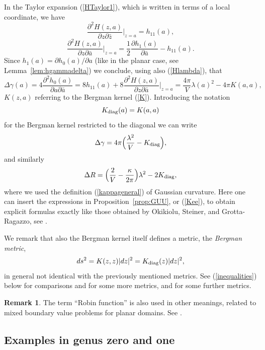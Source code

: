 \documentclass[reqno,12pt]{article}
\theoremstyle{plain}
\theoremstyle{definition}
\newtheorem{remark}[defn]{Remark}
\numberwithin{equation}{section}
\numberwithin{figure}{section}
\begin{document}
In the Taylor expansion (\ref{HTaylor1}), which is written in terms of a local coordinate, we have
$$
\frac{\partial^2 H(z,a)}{\partial z\partial\bar{z}}\Big|_{z=a}=h_{11}(a),
$$
$$
\frac{\partial^2 H(z,a)}{\partial z\partial\bar{a}}\Big|_{z=a}=\frac{1}{2}\frac{\partial h_1(a)}{\partial \bar{a}}-h_{11}(a).
$$
Since $h_1(a)=\partial h_0(a)/\partial a$ (like in the planar case, see Lemma~\ref{lem:hgammadelta})
we conclude, using also (\ref{Hlambda}), that 
$$
\Delta \gamma(a)=4\frac{\partial^2h_0(a)}{\partial a\partial\bar{a}}=8h_{11}(a)
+8\frac{\partial^2 H(z,a)}{\partial z\partial\bar{a}}\Big|_{z=a}
=\frac{4\pi}{V}\lambda(a)^2-4\pi K(a,a),
$$
$K(z,a)$ referring to the Bergman kernel (\ref{K}). Introducing the notation
$$
K_{\rm diag}(a)=K(a,a)
$$
for the Bergman kernel restricted to the diagonal we can write
\begin{equation}\label{Deltagammadouble}
\Delta \gamma=4\pi\Big(\frac{\lambda^2}{V}- K_{\rm diag}\Big),
\end{equation}
and similarly
\begin{equation}\label{DeltaR}
\Delta R =\Big(\frac{2}{V}-\frac{\kappa}{2\pi}\Big) \lambda^2-2K_{\rm diag},
\end{equation}
where we used the definition (\ref{kappageneral})  of Gaussian curvature. Here one can insert
the expressions in Proposition~\ref{prop:GUU}, or (\ref{Kee}), to obtain explicit formulas
exactly like those obtained by Okikiolu, Steiner, and Grotta-Ragazzo, see
 \cite{Okikiolu-2009, Steiner-2005, Grotta-Ragazzo-2024}. 

We remark that also the Bergman kernel itself defines a metric, the {\it Bergman metric},
\begin{equation}\label{Bergman metric}
ds^2=K(z,z)|dz|^2=K_{\rm diag}(z)|dz|^2,
\end{equation}
in general not identical with the previously mentioned metrics.
See (\ref{inequalities}) below for comparisons and for some more metrics,
and \cite{Jost-2001, Krantz-2004, Grotta-Ragazzo-2024} for some further metrics. 

\begin{remark}\label{rem:robin}
The term ``Robin function'' is also used in  other meanings, related to mixed boundary value problems for planar
domains. See \cite {Duren-Schiffer-1991}.
\end{remark}


\subsection{Examples in genus zero and one}\label{sec:examples}
\end{document}
